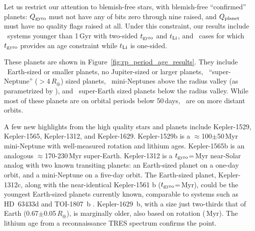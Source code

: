 \documentclass[11pt,twocolumn,tighten]{aastex63}
\begin{document}
Let us restrict our attention to blemish-free stars, with blemish-free
``confirmed'' planets:
$Q_{\rm gyro}$ must not have any of bits zero through nine
raised, and $Q_{\rm planet}$ must have no quality flags raised at all.
Under this constraint,
our results include \ltonegyrhighqconfirmedtwosided\ systems
younger than 1\,Gyr with two-sided $t_{\rm gyro}$ and $t_{\rm Li}$,
and \ltonegyrhighqconfirmedonesided\ cases for which $t_{\rm gyro}$ provides
an age constraint while $t_{\rm Li}$ is one-sided.

These planets are shown in Figure~\ref{fig:rp_period_age_results}.
They include \nearthshighqconfirmed\ Earth-sized or smaller planets,
no Jupiter-sized or larger planets,
\nsubsaturnshighqconfirmed\ ``super-Neptune'' ($>$4\,$R_\oplus$) sized
planets,
\nminineptuneshighqconfirmed\ mini-Neptunes above the 
radius valley (as parametrized by \citealt{2018MNRAS.479.4786V}),
and \nsuperearthshighqconfirmed\ super-Earth sized planets below the radius valley.
While most of these planets are on orbital periods below 50\,days,
\nlongperiodhighqconfirmed\ are on more distant orbits.


A few new highlights from the high quality stars and planets include
Kepler-1529, Kepler-1565, Kepler-1312, and Kepler-1629.
Kepler-1529b is a $\approx$100$\pm$50\,Myr mini-Neptune with well-measured
rotation and lithium ages.
Kepler-1565b is an analogous $\approx$170-230\,Myr super-Earth.
Kepler-1312 is a $t_{\rm gyro}$=\kepthirteentwelve\,Myr near-Solar analog with
two known transiting planets: an Earth-sized planet on a one-day orbit,
and a mini-Neptune on a five-day orbit.
The Earth-sized planet, Kepler-1312c, along with the near-identical
Kepler-1561 b ($t_{\rm gyro}$=\kepfifteensixone\,Myr), 
could be the
youngest Earth-sized planets currently known, comparable to systems
such as HD~63433d \citep[1.1\,$R_\oplus$,
$414$$\pm$$23$\,Myr;][]{2024AJ....167...54C} and TOI-1807~b \citep[1.3\,$R_\oplus$, 180$\pm$40\,Myr;][]{2021AJ....162...54H}.
Kepler-1629~b, with a size just two-thirds that of Earth
(0.67$\pm$0.05\,$R_\oplus$), is marginally older, also based on rotation
(\kepsixteentwonine\,Myr).  The lithium age from a reconnaissance 
TRES spectrum confirms the point.
\end{document}
